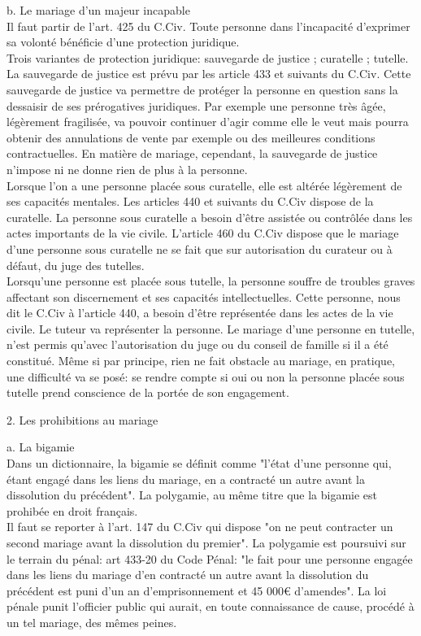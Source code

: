 \documentclass[12pt, a4paper, openany]{book}
\begin{document}
b. Le mariage d'un majeur incapable \\
Il faut partir de l'art. 425 du C.Civ. Toute personne dans l'incapacité d'exprimer sa volonté bénéficie d'une protection juridique. \\
Trois variantes de protection juridique: sauvegarde de justice ; curatelle ; tutelle. \\
La sauvegarde de justice est prévu par les article 433 et suivants du C.Civ. Cette sauvegarde de justice va permettre de protéger la personne en question sans la dessaisir de ses prérogatives juridiques. Par exemple une personne très âgée, légèrement fragilisée, va pouvoir continuer d'agir comme elle le veut mais pourra obtenir des annulations de vente par exemple ou des meilleures conditions contractuelles. En matière de mariage, cependant, la sauvegarde de justice n'impose ni ne donne rien de plus à la personne. \\
Lorsque l'on a une personne placée sous curatelle, elle est altérée légèrement de ses capacités mentales. Les articles 440 et suivants du C.Civ dispose de la curatelle. La personne sous curatelle a besoin d'être assistée ou contrôlée dans les actes importants de la vie civile. L'article 460 du C.Civ dispose que le mariage d'une personne sous curatelle ne se fait que sur autorisation du curateur ou à défaut, du juge des tutelles. \\
Lorsqu'une personne est placée sous tutelle, la personne souffre de troubles graves affectant son discernement et ses capacités intellectuelles. Cette personne, nous dit le C.Civ à l'article 440, a besoin d'être représentée dans les actes de la vie civile. Le tuteur va représenter la personne. Le mariage d'une personne en tutelle, n'est permis qu'avec l'autorisation du juge ou du conseil de famille si il a été constitué. Même si par principe, rien ne fait obstacle au mariage, en pratique, une difficulté va se posé: se rendre compte si oui ou non la personne placée sous tutelle prend conscience de la portée de son engagement. 


2. Les prohibitions au mariage


a. La bigamie \\
Dans un dictionnaire, la bigamie se définit comme "l'état d'une personne qui, étant engagé dans les liens du mariage, en a contracté un autre avant la dissolution du précédent". La polygamie, au même titre que la bigamie est prohibée en droit français. \\
Il faut se reporter à l'art. 147 du C.Civ qui dispose "on ne peut contracter un second mariage avant la dissolution du premier". La polygamie est poursuivi sur le terrain du pénal: art 433-20 du Code Pénal: "le fait pour une personne engagée dans les liens du mariage d'en contracté un autre avant la dissolution du précédent est puni d'un an d'emprisonnement et 45 000€ d'amendes". La loi pénale punit l'officier public qui aurait, en toute connaissance de cause, procédé à un tel mariage, des mêmes peines. 
\end{document}
